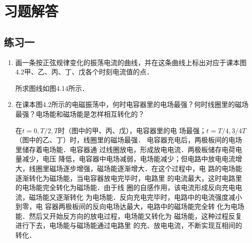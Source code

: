 \section{习题解答}
\subsection{练习一}
\begin{enumerate}
	\item 画一条按正弦规律变化的振荡电流的曲线，并在这条曲线上标出对应于课本图4.2甲、乙、丙、丁、戊各个时刻电流值的点．

    \begin{solution}
        所求图线如图4.14所示．
\begin{figure}[htp]
    \centering
{}
    \caption{}
\end{figure}
    \end{solution}
    
	\item 在课本图4.2所示的电磁振荡中，何时电容器里的电场最强？何时线圈里的磁场最强？电场能和磁场能是怎样相互转化的？

    \begin{solution}
在$t=0, T/2, T$时（图中的甲、丙、戊），电容器里的电
场最强；$t=T/4, 3/4T$（图中的乙、丁）时，线圈里的磁场最强．
电容器充电后，两极板间的电场里储存着电场能．电容器通
过线圈放电，形成放电电流．两极板储存电荷电量减少，电压
降低，电容器中电场减弱，电场能减少；但电路中放电电流增
大，线圈里磁场逐步增强，磁场能逐渐增大．在这个过程中，电
路的电场能逐渐转化为磁场能，当电容器放电完毕时，电路里
的电流最大，这时电路里的电场能完全转化为磁场能．由于线
圈的自感作用，该电流形成反向充电电流，磁场能又逐渐转化
为电场能．反向充电完毕时，电路中的电流强度减小到零，电
容器两极板间的反向电场达最大，电路中的磁场能完全转
化为电场能．然后又开始反方向的放电过程，电场能又转化为
磁场能，这种过程反复进行下去，电场能与磁场能通过电路里
的充、放电电流，不断实现互相间的转化．
    \end{solution}
    

\end{enumerate}
